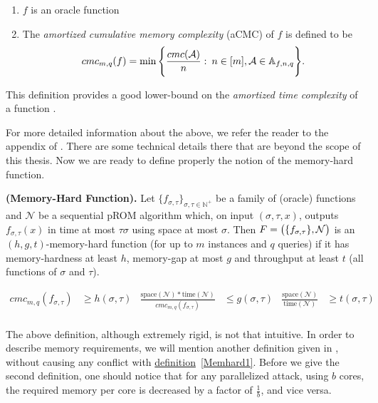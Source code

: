 \begin{enumerate}[label=(\alph*)]
  \item $f$ is an oracle function \\

  \item The \textit{amortized cumulative memory complexity} (aCMC) of $f$ is defined to be
  \begin{equation}
      cmc_{m,q}(f) = \min \Bigg{\{} \frac{cmc(\mathcal{A})}{n} : \: n \in [m], \mathcal{A} \in \mathbb{A}_{f,n,q} \Bigg{\}}.
  \end{equation}
\end{enumerate}
This definition provides a good lower-bound on the \textit{amortized time complexity} of a function \cite{Alwen:2015:HPC:2746539.2746622}.

For more detailed information about the above, we refer the reader to the appendix of \cite{cryptoeprint:2016:875}. There are some technical details there that are beyond the scope of this thesis. Now we are ready to define properly the notion of the memory-hard function.

\begin{definition}{\textbf{(Memory-Hard Function).}}{\label{Memhard1}} \textnormal{\cite{cryptoeprint:2016:875}}
  Let $\{ f_{\sigma, \tau} \}_{\sigma, \tau \in \mathbb{N}^{+}}$ be a family of (oracle) functions and $\mathcal{N}$ be a sequential pROM algorithm which, on input $(\sigma, \tau, x)$, outputs $f_{\sigma, \tau}(x)$ in time at most $\tau \sigma$ using space at most $\sigma$. Then $F=\big{(} \{ f_{\sigma,\tau} \}, \mathcal{N} \big{)}$
  is an $(h,g,t)$-memory-hard function (for up to $m$ instances and $q$ queries) if it has memory-hardness at least $h$, memory-gap at most $g$ and throughput at least $t$ (all functions of $\sigma$ and $\tau$).

\begin{align*}
cmc_{m,q}(f_{\sigma, \tau})&\geq h(\sigma, \tau)           &  \frac{\mbox{space}(\mathcal{N})*\mbox{time}(\mathcal{N})}{cmc_{m,q}(f_{\sigma, \tau})} &\leq g(\sigma, \tau)             &  \frac{\mbox{space}(\mathcal{N})}{\mbox{time}(\mathcal{N})} &\geq t(\sigma, \tau)\\
\end{align*}
%
\end{definition}

The above definition, although extremely rigid, is not that intuitive. In order to describe memory requirements, we will mention another definition given in \cite{ForlerLW13}, without causing any conflict with \hyperref[Memhard1]{definition}~\ref{Memhard1}. Before we give the second definition, one should notice that for any parallelized attack, using $b$ cores, the required memory per core is decreased by a factor of $\frac{1}{b}$, and vice versa.

